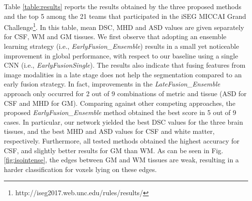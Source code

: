 \documentclass[twoside,espcrc2]{elsarticle}
\begin{document}
Table \ref{table:results} reports the results obtained by the three proposed methods and the top 5 among the 21 teams that participated in the iSEG MICCAI Grand Challenge\footnote{http://iseg2017.web.unc.edu/rules/results/}. In this table, mean DSC, MHD and ASD values are given separately for CSF, WM and GM tissues. We first observe that adopting an ensemble learning strategy (i.e., \textit{EarlyFusion\_Ensemble}) results in a small yet noticeable improvement in global performance, with respect to our baseline using a single CNN (i.e., \textit{EarlyFusionSingle}). The results also indicate that fusing features from image modalities in a late stage does not help the segmentation compared to an early fusion strategy. In fact, improvements in the \textit{LateFusion\_Ensemble} approach only occurred for 2 out of 9 combinations of metric and tissue (ASD for CSF and MHD for GM). Comparing against other competing approaches, the proposed \textit{EarlyFusion\_Ensemble} method obtained the best score in 5 out of 9 cases. In particular, our network yielded the best DSC values for the three brain tissues, and the best MHD and ASD values for CSF and white matter, respectively. Furthermore, all tested methods obtained the highest accuracy for CSF, and slightly better results for GM than WM. As can be seen in Fig. \ref{fig:isointense}, the edges between GM and WM tissues are weak, resulting in a harder classification for voxels lying on these edges. 
\end{document}
